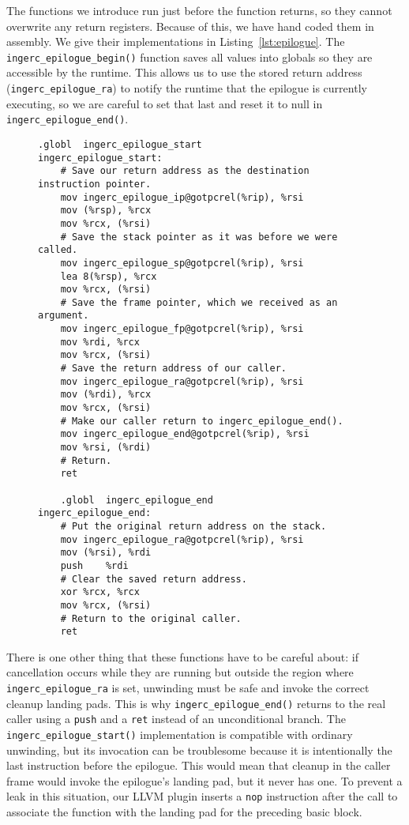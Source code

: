 The functions we introduce run just before the function returns, so they cannot
overwrite any return registers.  Because of this, we have hand coded them in
assembly.  We give their implementations in Listing~\ref{lst:epilogue}.  The
\texttt{ingerc\_epilogue\_begin()} function saves all values into globals so they are
accessible by the runtime.  This allows us to use the stored return address
(\texttt{ingerc\_epilogue\_ra}) to notify the runtime that the epilogue is currently
executing, so we are careful to set that last and reset it to null in
\texttt{ingerc\_epilogue\_end()}.

\begin{figure}
\begin{lstlisting}[label=lst:epilogue,language={[x86masm]Assembler},caption=Code to support time travel out of the epilogue. The \texttt{@gotpcrel} replocations are position-independent GOT lookups of the globals' accesses.]
	.globl	ingerc_epilogue_start
ingerc_epilogue_start:
	# Save our return address as the destination instruction pointer.
	mov	ingerc_epilogue_ip@gotpcrel(%rip), %rsi
	mov	(%rsp), %rcx
	mov	%rcx, (%rsi)
	# Save the stack pointer as it was before we were called.
	mov	ingerc_epilogue_sp@gotpcrel(%rip), %rsi
	lea	8(%rsp), %rcx
	mov	%rcx, (%rsi)
	# Save the frame pointer, which we received as an argument.
	mov	ingerc_epilogue_fp@gotpcrel(%rip), %rsi
	mov	%rdi, %rcx
	mov	%rcx, (%rsi)
	# Save the return address of our caller.
	mov	ingerc_epilogue_ra@gotpcrel(%rip), %rsi
	mov	(%rdi), %rcx
	mov	%rcx, (%rsi)
	# Make our caller return to ingerc_epilogue_end().
	mov	ingerc_epilogue_end@gotpcrel(%rip), %rsi
	mov	%rsi, (%rdi)
	# Return.
	ret

	.globl	ingerc_epilogue_end
ingerc_epilogue_end:
	# Put the original return address on the stack.
	mov	ingerc_epilogue_ra@gotpcrel(%rip), %rsi
	mov	(%rsi), %rdi
	push	%rdi
	# Clear the saved return address.
	xor	%rcx, %rcx
	mov	%rcx, (%rsi)
	# Return to the original caller.
	ret
\end{lstlisting}
\end{figure}

There is one other thing that these functions have to be careful about:\@
if cancellation occurs while they are running but outside the region where
\texttt{ingerc\_epilogue\_ra} is set, unwinding must be safe and invoke the correct
cleanup landing pads.  This is why \texttt{ingerc\_epilogue\_end()} returns to the
real caller using a \texttt{push} and a \texttt{ret} instead of an unconditional
branch.  The \texttt{ingerc\_epilogue\_start()} implementation is compatible with
ordinary unwinding, but its invocation can be troublesome because it is
intentionally the last instruction before the epilogue.  This would mean that cleanup
in the caller frame would invoke the epilogue's landing pad, but it never has one.
To prevent a leak in this situation, our LLVM plugin inserts a \texttt{nop}
instruction after the call to associate the function with the landing pad for the
preceding basic block.
